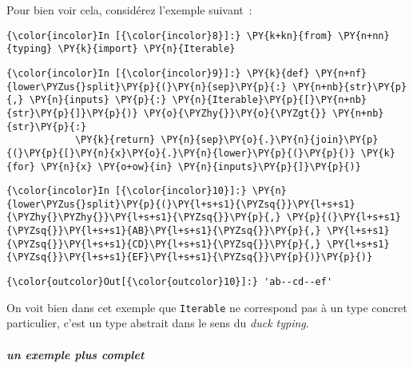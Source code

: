    Pour bien voir cela, considérez l'exemple suivant~:

    \begin{Verbatim}[commandchars=\\\{\},frame=single,framerule=0.3mm,rulecolor=\color{cellframecolor}]
{\color{incolor}In [{\color{incolor}8}]:} \PY{k+kn}{from} \PY{n+nn}{typing} \PY{k}{import} \PY{n}{Iterable}
\end{Verbatim}


    \begin{Verbatim}[commandchars=\\\{\},frame=single,framerule=0.3mm,rulecolor=\color{cellframecolor}]
{\color{incolor}In [{\color{incolor}9}]:} \PY{k}{def} \PY{n+nf}{lower\PYZus{}split}\PY{p}{(}\PY{n}{sep}\PY{p}{:} \PY{n+nb}{str}\PY{p}{,} \PY{n}{inputs} \PY{p}{:} \PY{n}{Iterable}\PY{p}{[}\PY{n+nb}{str}\PY{p}{]}\PY{p}{)} \PY{o}{\PYZhy{}}\PY{o}{\PYZgt{}} \PY{n+nb}{str}\PY{p}{:}
            \PY{k}{return} \PY{n}{sep}\PY{o}{.}\PY{n}{join}\PY{p}{(}\PY{p}{[}\PY{n}{x}\PY{o}{.}\PY{n}{lower}\PY{p}{(}\PY{p}{)} \PY{k}{for} \PY{n}{x} \PY{o+ow}{in} \PY{n}{inputs}\PY{p}{]}\PY{p}{)}
\end{Verbatim}


    \begin{Verbatim}[commandchars=\\\{\},frame=single,framerule=0.3mm,rulecolor=\color{cellframecolor}]
{\color{incolor}In [{\color{incolor}10}]:} \PY{n}{lower\PYZus{}split}\PY{p}{(}\PY{l+s+s1}{\PYZsq{}}\PY{l+s+s1}{\PYZhy{}\PYZhy{}}\PY{l+s+s1}{\PYZsq{}}\PY{p}{,} \PY{p}{(}\PY{l+s+s1}{\PYZsq{}}\PY{l+s+s1}{AB}\PY{l+s+s1}{\PYZsq{}}\PY{p}{,} \PY{l+s+s1}{\PYZsq{}}\PY{l+s+s1}{CD}\PY{l+s+s1}{\PYZsq{}}\PY{p}{,} \PY{l+s+s1}{\PYZsq{}}\PY{l+s+s1}{EF}\PY{l+s+s1}{\PYZsq{}}\PY{p}{)}\PY{p}{)}
\end{Verbatim}


\begin{Verbatim}[commandchars=\\\{\},frame=single,framerule=0.3mm,rulecolor=\color{cellframecolor}]
{\color{outcolor}Out[{\color{outcolor}10}]:} 'ab--cd--ef'
\end{Verbatim}
            
    On voit bien dans cet exemple que \texttt{Iterable} ne correspond pas à
un type concret particulier, c'est un type abstrait dans le sens du
\emph{duck typing}.

    \hypertarget{un-exemple-plus-complet}{%
\subparagraph{un exemple plus complet}\label{un-exemple-plus-complet}}

